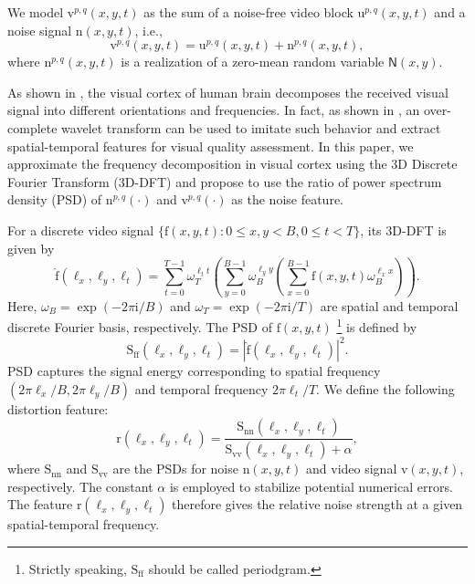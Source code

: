 \documentclass{sig-alternate}
\begin{document}
We model $\mathrm{v}^{p,q}(x,y,t)$ as the sum of a noise-free video block $\mathrm{u}^{p,q}(x,y,t)$ and a noise signal $\mathrm{n}(x,y,t)$, i.e.,
\begin{equation}
\mathrm{v}^{p,q}(x,y,t) = \mathrm{u}^{p,q}(x,y,t) + \mathrm{n}^{p,q}(x,y,t),
\end{equation}
where $\mathrm{n}^{p,q}(x,y,t)$ is a realization of a zero-mean random variable $\mathsf{N}(x,y)$. 

As shown in \cite{Bov2013,Dau1985,OlsFie2005}, the visual cortex of human brain decomposes the received visual signal into different orientations and frequencies. In fact, as shown in \cite{Gir1989,MOVIE}, an over-complete wavelet transform can be used to imitate such behavior and extract spatial-temporal features for visual quality assessment. In this paper, we approximate the frequency decomposition in visual cortex using the 3D Discrete Fourier Transform (3D-DFT) and propose to use the ratio of power spectrum density (PSD) of $\mathrm{n}^{p,q}(\cdot)$ and $\mathrm{v}^{p,q}(\cdot)$ as the noise feature. 

For a discrete video signal $\{\mathrm{f}(x,y,t):0\leq x,y<B, 0\leq t<T\}$, its 3D-DFT is given by
\begin{equation*}
\label{eq:dft}
\mathrm{\hat f}(\ell_x,\ell_y,\ell_t)=\sum_{t=0}^{T-1}\omega_T^{\ell_t t}\left(\sum_{y=0}^{B-1}\omega_B^{\ell_y y}\left(\sum_{x=0}^{B-1}\mathrm{f}(x,y,t)\omega_B^{\ell_x x}\right)\right).
\end{equation*}
Here, $\omega_B=\exp(-2\pi\mathrm{i}/B)$ and $\omega_T=\exp(-2\pi\mathrm{i}/T)$ are spatial and temporal discrete Fourier basis, respectively. The PSD of $\mathrm{f}(x,y,t)$ \footnote{Strictly speaking, $\mathrm{S_{ff}}$ should be called periodgram.} is defined by
\begin{equation}
\label{eq:psd}
\mathrm{S_{ff}}(\ell_x,\ell_y,\ell_t) = |\mathrm{\hat f}(\ell_x,\ell_y,\ell_t)|^2.
\end{equation}
PSD captures the signal energy corresponding to spatial frequency $(2\pi\ell_x/B,2\pi\ell_y/B)$ and temporal frequency $2\pi\ell_t/T$. We define the following distortion feature:
\begin{equation}
\label{eq:feature}
\mathrm{r}(\ell_x,\ell_y,\ell_t)=\frac{\mathrm{S_{nn}}(\ell_x,\ell_y,\ell_t)}{\mathrm{S_{vv}}(\ell_x,\ell_y,\ell_t) + \alpha},
\end{equation}
where $\mathrm{S_{nn}}$ and $\mathrm{S_{vv}}$ are the PSDs for noise $\mathrm{n}(x,y,t)$ and video signal $\mathrm{v}(x,y,t)$, respectively. The constant $\alpha$ is employed to stabilize potential numerical errors. The feature $\mathrm{r}(\ell_x,\ell_y,\ell_t)$ therefore gives the relative noise strength at a given spatial-temporal frequency.  
\end{document}
